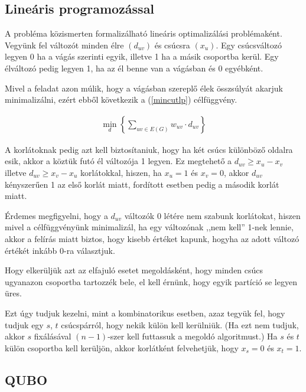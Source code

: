 \subsection{Lineáris programozással}\label{sec:theoryMinCutLP}
A probléma közismerten formalizálható lineáris optimalizálási problémaként.
Vegyünk fel változót minden élre $(d_{uv})$ és csúcsra $(x_{u})$. Egy csúcsváltozó legyen 0 ha a vágás szerinti egyik, illetve 1 ha a másik csoportba kerül. Egy élváltozó pedig legyen 1, ha az él benne van a vágásban és 0 egyébként.

Mivel a feladat azon múlik, hogy a vágásban szereplő élek összsúlyát akarjuk minimalizálni, ezért ebből következik a (\ref{mincutlp}) célfüggvény.

\begin{align} 
	\min_{d} \left\{ \sum_ {uv \in E(G)}{w_{uv}\cdot d_{uv}} \right\} \label{mincutlp}
\end{align}

A korlátoknak pedig azt kell biztosítaniuk, hogy ha két csúcs különböző oldalra esik, akkor a köztük futó él változója 1 legyen. Ez megtehető a $d_{uv} \geq x_u - x_v$ illetve $d_{uv} \geq x_v - x_u$ korlátokkal, hiszen, ha $x_u=1$ és $x_v=0$, akkor $d_{uv}$ kényszerűen 1 az első korlát miatt, fordított esetben pedig a második korlát miatt.

Érdemes megfigyelni, hogy a $d_{uv}$ változók 0 létére nem szabunk korlátokat, hiszen mivel a célfüggvényünk minimalizál, ha egy változónak ,,nem kell'' 1-nek lennie, akkor a felírás miatt biztos, hogy kisebb értéket kapunk, hogyha az adott változó értékét inkább 0-ra választjuk.

Hogy elkerüljük azt az elfajuló esetet megoldásként, hogy minden csúcs ugyanazon csoportba tartozzék bele, el kell érnünk, hogy egyik partíció se legyen üres. 

Ezt úgy tudjuk kezelni, mint a kombinatorikus esetben, azaz tegyük fel, hogy tudjuk egy $s$, $t$ csúcspárról, hogy nekik külön kell kerülniük. (Ha ezt nem tudjuk, akkor $s$ fixálásával $(n-1)$-szer kell futtassuk a megoldó algoritmust.)
Ha $s$ és $t$ külön csoportba kell kerüljön, akkor korlátként felvehetjük, hogy $x_s=0$ és $x_t=1$.





\subsection{QUBO}\label{sec:theoryMinCutQUBO}

